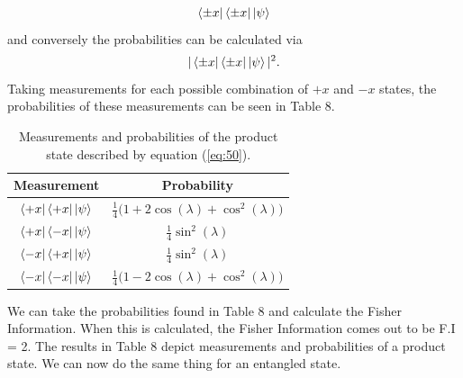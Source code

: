 \documentclass[twocolumn]{article}
\begin{document}
\begin{equation} \label{eq:53}
\bra{\pm x}\bra{\pm x}\ket{\psi}
\end{equation}
and conversely the probabilities can be calculated via
\begin{equation} \label{eq:54}
|\bra{\pm x}\bra{\pm x}\ket{\psi}|^2.
\end{equation}
Taking measurements for each possible combination of $+x$ and $-x$ states, the probabilities of these measurements can be seen in Table 8.
\begin{table}[h!]
\begin{center}
\begin{tabular}{ |c|c| }
\hline Measurement & Probability \\
\hline $\bra{+x}\bra{+x}\ket{\psi}$ & $\frac{1}{4}\big(1+2\cos{(\lambda)}+\cos^2{(\lambda)}\big)$ \\
\hline $\bra{+x}\bra{-x}\ket{\psi}$ & $\frac{1}{4}\sin^2{(\lambda)}$ \\
\hline $\bra{-x}\bra{+x}\ket{\psi}$ & $\frac{1}{4}\sin^2{(\lambda)}$ \\
\hline $\bra{-x}\bra{-x}\ket{\psi}$ & $\frac{1}{4}\big(1-2\cos{(\lambda)}+\cos^2{(\lambda)}\big)$ \\
\hline
\end{tabular}
\caption{Measurements and probabilities of the product state described by equation (\ref{eq:50}).}
\end{center}
\end{table} 
\newline
We can take the probabilities found in Table 8 and calculate the Fisher Information. When this is calculated, the Fisher Information comes out to be F.I = 2. The results in Table 8 depict measurements and probabilities of a product state. We can now do the same thing for an entangled state.
\end{document}
